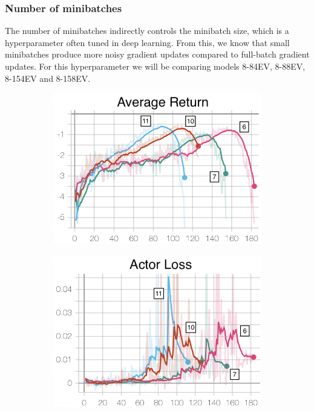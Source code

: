\subsubsection{Number of minibatches}
The number of minibatches indirectly controls the minibatch size, which is a hyperparameter often tuned in deep learning. From this, we know that small minibatches produce more noisy gradient updates compared to full-batch gradient updates. For this hyperparameter we will be comparing models 8-84EV, 8-88EV, 8-154EV and 8-158EV.
\begin{figure}[hbt]
     \centering
     \begin{subfigure}[b]{0.32\textwidth}
         \centering
         \includegraphics[width=\textwidth]{figures/5_/Training/ppo_nminibatchAvgReturn.png}
         \caption{}
         \label{fig:5_training_ppo_nminibatchAvgReturn}
     \end{subfigure} 
     \hfill
     \begin{subfigure}[b]{0.32\textwidth}
         \centering
         \includegraphics[width=\textwidth]{figures/5_/Training/ppo_nminibatchActorL.png}

\end{subfigure}
\end{figure}
